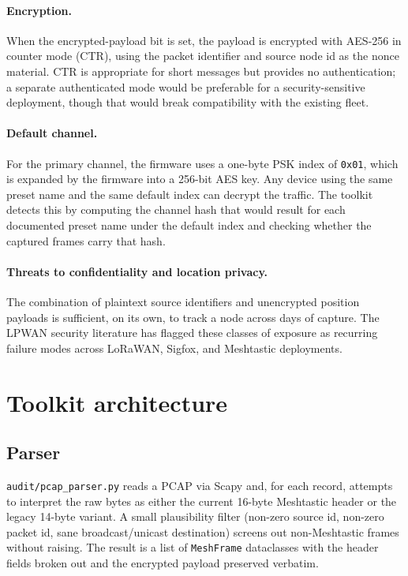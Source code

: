 \documentclass[conference,a4paper,10pt]{IEEEtran}
\begin{document}
\paragraph{Encryption.}
When the encrypted-payload bit is set, the payload is encrypted with
AES-256 in counter mode (CTR), using the packet identifier and source
node id as the nonce material. CTR \cite{nist80038a} is appropriate
for short messages but provides no authentication; a separate
authenticated mode would be preferable for a security-sensitive
deployment, though that would break compatibility with the existing
fleet.

\paragraph{Default channel.}
For the primary channel, the firmware uses a one-byte PSK index of
\texttt{0x01}, which is expanded by the firmware into a 256-bit AES
key. Any device using the same preset name and the same default
index can decrypt the traffic. The toolkit detects this by computing
the channel hash that would result for each documented preset name
under the default index and checking whether the captured frames
carry that hash.

\paragraph{Threats to confidentiality and location privacy.}
The combination of plaintext source identifiers and unencrypted
position payloads is sufficient, on its own, to track a node across
days of capture. The LPWAN security literature
\cite{adelantado2017,enisa2024} has flagged these classes of
exposure as recurring failure modes across LoRaWAN, Sigfox, and
Meshtastic deployments.

\section{Toolkit architecture}

\subsection{Parser}

\texttt{audit/pcap\_parser.py} reads a PCAP via Scapy and, for each
record, attempts to interpret the raw bytes as either the current
16-byte Meshtastic header or the legacy 14-byte variant. A small
plausibility filter (non-zero source id, non-zero packet id, sane
broadcast/unicast destination) screens out non-Meshtastic frames
without raising. The result is a list of \texttt{MeshFrame}
dataclasses with the header fields broken out and the encrypted
payload preserved verbatim.
\end{document}

